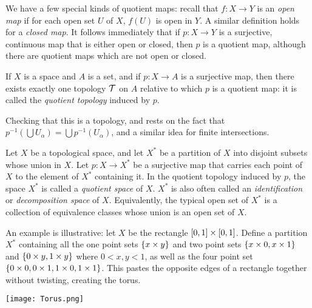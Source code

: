\documentclass[10pt]{report}
\begin{document}
We have a few special kinds of quotient maps:
recall that $f:X \rightarrow Y$ is an \emph{open map} if for each open set $U$ of $X$, $f(U)$ is open in $Y$.
A similar definition holds for a \emph{closed map}.
It follows immediately that if $p:X \rightarrow Y$ is a surjective, continuous map that is either open or closed, then $p$ is a quotient map, although there are quotient maps which are not open or closed.

\begin{definition}
  If $X$ is a space and $A$ is a set, and if $p:X \rightarrow A$ is a surjective map, then there exists exactly one topology $\mathcal{T}$ on $A$ relative to which $p$ is a quotient map:
  it is called the \emph{quotient topology} induced by $p$.
\end{definition}
Checking that this is a topology, and rests on the fact that $p^{-1}(\bigcup U_\alpha) = \bigcup p^{-1}(U_\alpha)$, and a similar idea for finite intersections.

\begin{definition}
  Let $X$ be a topological space, and let $X^*$ be a partition of $X$ into disjoint subsets whose union in $X$.
  Let $p:X \rightarrow X^*$ be a surjective map that carries each point of $X$ to the element of $X^*$ containing it.
  In the quotient topology induced by $p$, the space $X^*$ is called a \emph{quotient space} of $X$.
  $X^*$ is also often called an \emph{identification} or \emph{decomposition space} of $X$.
  Equivalently, the typical open set of $X^*$ is a collection of equivalence classes whose union is an open set of $X$.
\end{definition}

An example is illustrative: let $X$ be the rectangle $\left[ 0,1 \right] \times \left[ 0,1 \right]$.
Define a partition $X^*$ containing all the one point sets $\left\{ x \times y \right\}$ and two point sets $\left\{ x \times 0,x \times 1 \right\}$ and $\left\{ 0 \times y, 1 \times y \right\}$ where $0 < x,y < 1$, as well as the four point set $\left\{ 0 \times 0, 0 \times 1, 1 \times 0, 1 \times 1 \right\}$.
This pastes the opposite edges of a rectangle together without twisting, creating the torus.

\begin{center}
  \texttt{[image: Torus.png]}
\end{center}
\end{document}
